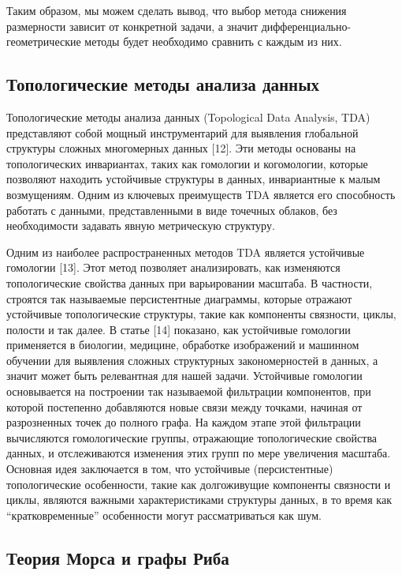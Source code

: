 \documentclass[a4paper,12pt]{extarticle}
\begin{document}
Таким образом, мы можем сделать вывод, что выбор метода снижения размерности зависит от конкретной задачи, а значит дифференциально-геометрические методы будет необходимо сравнить с каждым из них.

\subsection{Топологические методы анализа данных}

Топологические методы анализа данных (Topological Data Analysis, TDA) представляют собой мощный инструментарий для выявления глобальной структуры сложных многомерных данных [12]. Эти методы основаны на топологических инвариантах, таких как гомологии и когомологии, которые позволяют находить устойчивые структуры в данных, инвариантные к малым возмущениям. Одним из ключевых преимуществ TDA является его способность работать с данными, представленными в виде точечных облаков, без необходимости задавать явную метрическую структуру.

Одним из наиболее распространенных методов TDA является устойчивые гомологии [13]. Этот метод позволяет анализировать, как изменяются топологические свойства данных при варьировании масштаба. В частности, строятся так называемые персистентные диаграммы, которые отражают устойчивые топологические структуры, такие как компоненты связности, циклы, полости и так далее. В статье [14] показано, как устойчивые гомологии применяется в биологии, медицине, обработке изображений и машинном обучении для выявления сложных структурных закономерностей в данных, а значит может быть релевантная для нашей задачи. Устойчивые гомологии основывается на построении так называемой фильтрации компонентов, при которой постепенно добавляются новые связи между точками, начиная от разрозненных точек до полного графа. На каждом этапе этой фильтрации вычисляются гомологические группы, отражающие топологические свойства данных, и отслеживаются изменения этих групп по мере увеличения масштаба. Основная идея заключается в том, что устойчивые (персистентные) топологические особенности, такие как долгоживущие компоненты связности и циклы, являются важными характеристиками структуры данных, в то время как ``кратковременные'' особенности могут рассматриваться как шум.

\subsection{Теория Морса и графы Риба}
\end{document}
